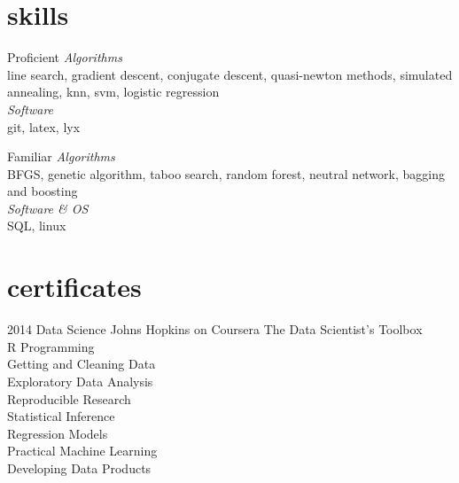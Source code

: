 \documentclass[]{friggeri-cv} %
\begin{document}
\section{skills}
\begin{entrylist}
\entry
{}
{Proficient}
{}
{\emph{Algorithms}\\
line search, gradient descent, conjugate descent, quasi-newton methods, simulated annealing, knn, svm, logistic regression\\
\emph{Software}\\%
git, latex, lyx}


\entry
{}
{Familiar}
{}
{\emph{Algorithms}\\
BFGS, genetic algorithm, taboo search, random forest, neutral network, bagging and boosting\\ %
\emph{Software \& OS}\\
SQL, linux
}

\end{entrylist}













\section{certificates}

\begin{entrylist}
\entry
{2014}
{Data Science}
{Johns Hopkins on Coursera}
{The Data Scientist's Toolbox\\
R Programming\\
Getting and Cleaning Data\\
Exploratory Data Analysis\\
Reproducible Research\\
Statistical Inference\\
Regression Models\\
Practical Machine Learning\\
Developing Data Products}
\end{entrylist}
\end{document}
